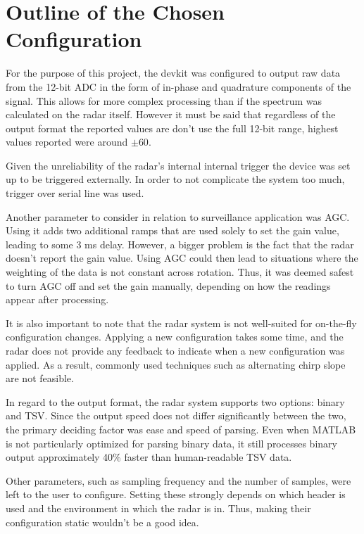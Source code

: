 \section{Outline of the Chosen Configuration }

For the purpose of this project, the devkit was configured to output raw data from the 12-bit ADC in the form of in-phase and quadrature components of the signal.
This allows for more complex processing than if the spectrum was calculated on the radar itself.
However it must be said that regardless of the output format the reported values are don't use the full 12-bit range, highest values reported were around $\pm 60$.

Given the unreliability of the radar's internal internal trigger the device was set up to be triggered externally.
In order to not complicate the system too much, trigger over serial line was used.

Another parameter to consider in relation to surveillance application was AGC.
Using it adds two additional ramps that are used solely to set the gain value, leading to some 3 ms delay.
However, a bigger problem is the fact that the radar doesn't report the gain value.
Using AGC could then lead to situations where the weighting of the data is not constant across rotation.
Thus, it was deemed safest to turn AGC off and set the gain manually, depending on how the readings appear after processing.

It is also important to note that the radar system is not well-suited for on-the-fly configuration changes.
Applying a new configuration takes some time, and the radar does not provide any feedback to indicate when a new configuration was applied.
As a result, commonly used techniques such as alternating chirp slope are not feasible.

In regard to the output format, the radar system supports two options: binary and TSV.
Since the output speed does not differ significantly between the two, the primary deciding factor was ease and speed of parsing.
Even when MATLAB is not particularly optimized for parsing binary data, it still processes binary output approximately 40\% faster than human-readable TSV data.

Other parameters, such as sampling frequency and the number of samples, were left to the user to configure.
Setting these strongly depends on which header is used and the environment in which the radar is in.
Thus, making their configuration static wouldn't be a good idea.


